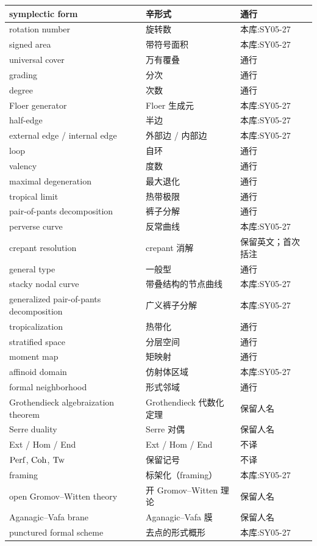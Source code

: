 \begin{longtable}{@{}p{}p{}p{}@{}}
symplectic form & 辛形式 & 通行 \\
\midrule
rotation number & 旋转数 & 本库:SY05-27 \\
\midrule
signed area & 带符号面积 & 本库:SY05-27 \\
\midrule
universal cover & 万有覆叠 & 通行 \\
\midrule
grading & 分次 & 通行 \\
\midrule
degree & 次数 & 通行 \\
\midrule
Floer generator & Floer 生成元 & 本库:SY05-27 \\
\midrule
half-edge & 半边 & 本库:SY05-27 \\
\midrule
external edge / internal edge & 外部边 / 内部边 & 本库:SY05-27 \\
\midrule
loop & 自环 & 通行 \\
\midrule
valency & 度数 & 通行 \\
\midrule
maximal degeneration & 最大退化 & 通行 \\
\midrule
tropical limit & 热带极限 & 通行 \\
\midrule
pair-of-pants decomposition & 裤子分解 & 通行 \\
\midrule
perverse curve & 反常曲线 & 本库:SY05-27 \\
\midrule
crepant resolution & crepant 消解 & 保留英文；首次括注 \\
\midrule
general type & 一般型 & 通行 \\
\midrule
stacky nodal curve & 带叠结构的节点曲线 & 本库:SY05-27 \\
\midrule
generalized pair-of-pants decomposition & 广义裤子分解 & 本库:SY05-27 \\
\midrule
tropicalization & 热带化 & 通行 \\
\midrule
stratified space & 分层空间 & 通行 \\
\midrule
moment map & 矩映射 & 通行 \\
\midrule
affinoid domain & 仿射体区域 & 本库:SY05-27 \\
\midrule
formal neighborhood & 形式邻域 & 通行 \\
\midrule
Grothendieck algebraization theorem & Grothendieck 代数化定理 & 保留人名 \\
\midrule
Serre duality & Serre 对偶 & 保留人名 \\
\midrule
Ext / Hom / End & Ext / Hom / End & 不译 \\
\midrule
$\operatorname{Perf}$, $\operatorname{Coh}$, $\operatorname{Tw}$ & 保留记号 & 不译 \\
\midrule
framing & 标架化（framing） & 本库:SY05-27 \\
\midrule
open Gromov–Witten theory & 开 Gromov–Witten 理论 & 保留人名 \\
\midrule
Aganagic–Vafa brane & Aganagic–Vafa 膜 & 保留人名 \\
\midrule
punctured formal scheme & 去点的形式概形 & 本库:SY05-27 
\end{longtable}
\endgroup
